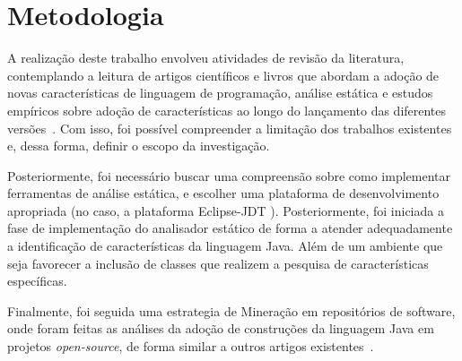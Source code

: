 %


\section{Metodologia}
    
    A realização deste trabalho envolveu atividades de revisão da literatura, contemplando a leitura de artigos científicos e livros que abordam a adoção de novas características de linguagem de programação, análise estática e estudos empíricos sobre adoção de características ao longo do lançamento das diferentes versões~\cite{Schaefer:ACM2009,Parnin:ACM2011,Overbey:2009,bonifacio:scam2015}. Com isso, foi possível compreender a limitação dos trabalhos existentes e, dessa forma, definir o escopo da investigação. 
    
    Posteriormente, foi necessário buscar uma compreensão sobre como implementar ferramentas de 
    análise estática, e escolher uma plataforma de desenvolvimento apropriada (no caso, a plataforma Eclipse-JDT \cite{EclipseJDT}). Posteriormente, foi iniciada a fase de implementação do analisador estático de forma a atender adequadamente a identificação de características da linguagem Java. Além de um ambiente que seja favorecer a inclusão de classes que realizem a pesquisa de características específicas.   
     
    Finalmente, foi seguida uma estrategia de Mineração em repositórios de software, onde foram feitas as análises da adoção de construções da linguagem Java em projetos \textit{open-source}, de forma similar a outros artigos existentes~\cite{pinto-jss:2015,Schaefer:ACM2009, Schaefer:ACM2010, Overbey:2009}.
     